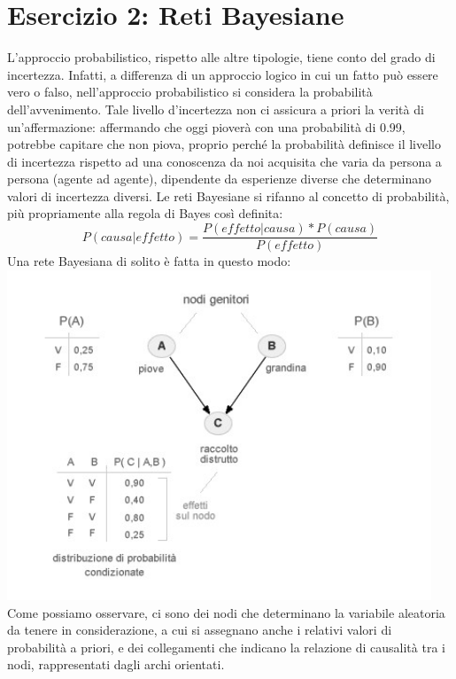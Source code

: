 		\section{Esercizio 2: Reti Bayesiane}
		\label{sec:es2}
		L'approccio probabilistico, rispetto alle altre tipologie, tiene conto del grado di incertezza. Infatti, a differenza di un approccio logico in cui un fatto può essere vero o falso, nell'approccio probabilistico si considera la probabilità dell'avvenimento. Tale livello d'incertezza non ci assicura a priori la verità di un'affermazione: affermando che oggi pioverà con una probabilità di 0.99, potrebbe capitare che non piova, proprio perché la probabilità definisce il livello di incertezza rispetto ad una conoscenza da noi acquisita che varia da persona a persona (agente ad agente), dipendente da esperienze diverse che determinano valori di incertezza diversi. Le reti Bayesiane si rifanno al concetto di probabilità, più propriamente alla regola di Bayes così definita:
		\begin{equation}
			P(causa|effetto)=\frac{P(effetto|causa)*P(causa)}{P(effetto)}
		\end{equation}
		Una rete Bayesiana di solito è fatta in questo modo:
		\includegraphics[width=0.95\textwidth, height=0.40\textheight]{retebayesiana.jpg}
		Come possiamo osservare, ci sono dei nodi che determinano la variabile aleatoria da tenere in considerazione, a cui si assegnano anche i relativi valori di probabilità a priori, e dei collegamenti che indicano la relazione di causalità tra i nodi, rappresentati dagli archi orientati.
		\par 
